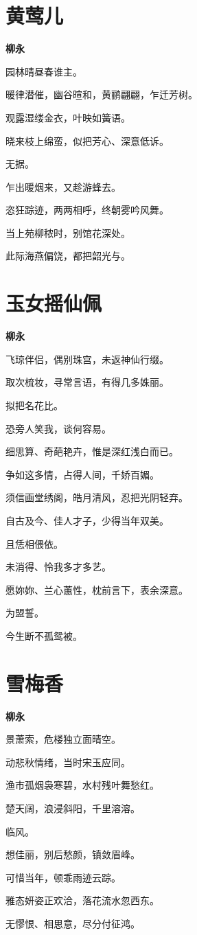 \documentclass[12pt,a4paper]{ctexbook}
\begin{document}
\section{黄莺儿}
\textbf{柳永}\par\vspace{0.5em}
园林晴昼春谁主。\par
暖律潜催，幽谷暄和，黄鹂翩翩，乍迁芳树。\par
观露湿缕金衣，叶映如簧语。\par
晓来枝上绵蛮，似把芳心、深意低诉。\par
无据。\par
乍出暖烟来，又趁游蜂去。\par
恣狂踪迹，两两相呼，终朝雾吟风舞。\par
当上苑柳秾时，别馆花深处。\par
此际海燕偏饶，都把韶光与。\par

\section{玉女摇仙佩}
\textbf{柳永}\par\vspace{0.5em}
飞琼伴侣，偶别珠宫，未返神仙行缀。\par
取次梳妆，寻常言语，有得几多姝丽。\par
拟把名花比。\par
恐旁人笑我，谈何容易。\par
细思算、奇葩艳卉，惟是深红浅白而已。\par
争如这多情，占得人间，千娇百媚。\par
须信画堂绣阁，皓月清风，忍把光阴轻弃。\par
自古及今、佳人才子，少得当年双美。\par
且恁相偎依。\par
未消得、怜我多才多艺。\par
愿妳妳、兰心蕙性，枕前言下，表余深意。\par
为盟誓。\par
今生断不孤鸳被。\par

\section{雪梅香}
\textbf{柳永}\par\vspace{0.5em}
景萧索，危楼独立面晴空。\par
动悲秋情绪，当时宋玉应同。\par
渔市孤烟袅寒碧，水村残叶舞愁红。\par
楚天阔，浪浸斜阳，千里溶溶。\par
临风。\par
想佳丽，别后愁颜，镇敛眉峰。\par
可惜当年，顿乖雨迹云踪。\par
雅态妍姿正欢洽，落花流水忽西东。\par
无憀恨、相思意，尽分付征鸿。\par
\end{document}

